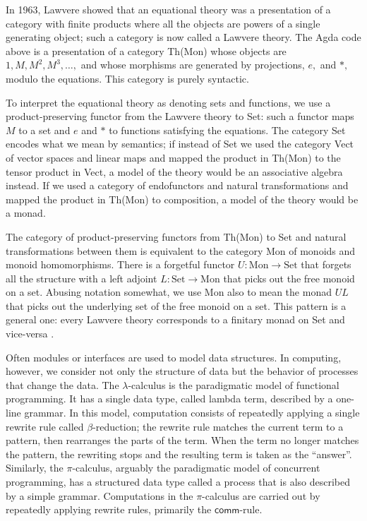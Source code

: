 \documentclass{llncs}
\newcommand{\maps}{\colon}
\newcommand{\Set}{\mathrm{Set}}
\newcommand{\Mon}{\mathrm{Mon}}
\begin{document}
  In 1963, Lawvere \cite{Lawvere} showed that an equational theory was a presentation of a category with finite products where all the objects are powers of a single generating object; such a category is now called a Lawvere theory.  The Agda code above is a presentation of a category Th(Mon) whose objects are $1, M, M^2, M^3, \ldots,$  and whose morphisms are generated by projections, $e,$ and $*,$  modulo the equations.  This category is purely syntactic.

  To interpret the equational theory as denoting sets and functions, we use a product-preserving functor from the Lawvere theory to Set:  such a functor maps $M$ to a set and $e$ and $*$ to functions satisfying the equations.  The category Set encodes what we mean by semantics; if instead of Set we used the category Vect of vector spaces and linear maps and mapped the product in Th(Mon) to the tensor product in Vect, a model of the theory would be an associative algebra instead.  If we used a category of endofunctors and natural transformations and mapped the product in Th(Mon) to composition, a model of the theory would be a monad.

  The category of product-preserving functors from Th(Mon) to Set and natural transformations between them is equivalent to the category Mon of monoids and monoid homomorphisms.  There is a forgetful functor $U\maps \Mon \to \Set$ that forgets all the structure with a left adjoint $L\maps \Set \to \Mon$ that picks out the free monoid on a set.  Abusing notation somewhat, we use Mon also to mean the monad $UL$ that picks out the underlying set of the free monoid on a set.  This pattern is a general one: every Lawvere theory corresponds to a finitary monad on Set and vice-versa \cite{DBLP:journals/entcs/HylandP07}.

  Often modules or interfaces are used to model data structures.  In computing, however, we consider not only the structure of data but the behavior of processes that change the data.  The $\lambda$-calculus is the paradigmatic model of functional programming.  It has a single data type, called lambda term, described by a one-line grammar.  In this model, computation consists of repeatedly applying a single rewrite rule called $\beta$-reduction; the rewrite rule matches the current term to a pattern, then rearranges the parts of the term.  When the term no longer matches the pattern, the rewriting stops and the resulting term is taken as the ``answer''.  Similarly, the $\pi$-calculus, arguably the paradigmatic model of concurrent programming, has a structured data type called a process that is also described by a simple grammar.  Computations in the $\pi$-calculus are carried out by repeatedly applying rewrite rules, primarily the $\mathsf{comm}$-rule.
\end{document}
